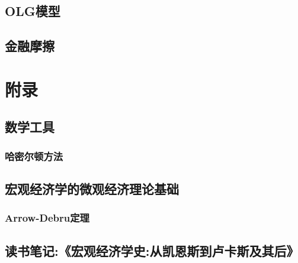 \documentclass[lang=cn,10pt]{elegantbook}
\begin{document}
\chapter{OLG模型}

\chapter{金融摩擦}

\part{附录}
\chapter{数学工具}
\section{哈密尔顿方法}
\chapter{宏观经济学的微观经济理论基础}
\section{Arrow-Debru定理}
\chapter{读书笔记:《宏观经济学史:从凯恩斯到卢卡斯及其后》}
\end{document}
